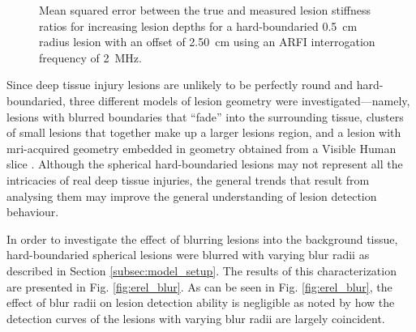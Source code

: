 			\begin{figure}[!htb]
				\centering
				\caption[Shear-wave speed quantified mean squared error related to lesion depth]{Mean squared error between the true and measured lesion stiffness ratios for increasing lesion depths for a hard-boundaried \SI{0.5}{cm} radius lesion with an offset of \SI{2.50}{\cm} using an ARFI interrogation frequency of \SI{2}{\MHz}.}
				\label{fig:erel_depth_mse_o250}
			\end{figure}

			Since deep tissue injury lesions are unlikely to be perfectly round and hard-boundaried, three different models of lesion geometry were investigated---namely, lesions with blurred boundaries that ``fade'' into the surrounding tissue, clusters of small lesions that together make up a larger lesions region, and a lesion with mri-acquired geometry \cite{solis13} embedded in geometry obtained from a Visible Human slice \cite{visiblehuman}. Although the spherical hard-boundaried lesions may not represent all the intricacies of real deep tissue injuries, the general trends that result from analysing them may improve the general understanding of lesion detection behaviour.

			In order to investigate the effect of blurring lesions into the background tissue, hard-boundaried spherical lesions were blurred with varying blur radii as described in Section \ref{subsec:model_setup}. The results of this characterization are presented in Fig. \ref{fig:erel_blur}. As can be seen in Fig. \ref{fig:erel_blur}, the effect of blur radii on lesion detection ability is negligible as noted by how the detection curves of the lesions with varying blur radii are largely coincident.

